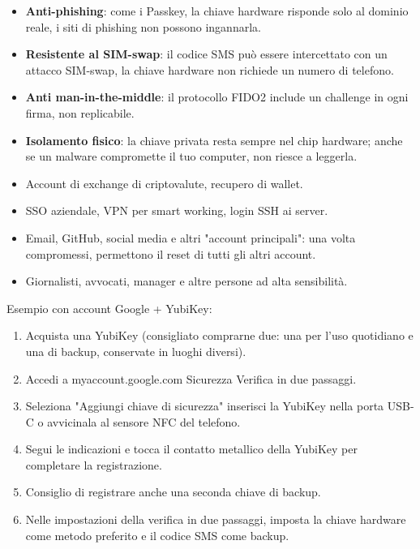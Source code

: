 
\begin{itemize}
  \item \textbf{Anti-phishing}: come i Passkey, la chiave hardware risponde solo al dominio reale, i siti di phishing non possono ingannarla.
  \item \textbf{Resistente al SIM-swap}: il codice SMS può essere intercettato con un attacco SIM-swap, la chiave hardware non richiede un numero di telefono.
  \item \textbf{Anti man-in-the-middle}: il protocollo FIDO2 include un challenge in ogni firma, non replicabile.
  \item \textbf{Isolamento fisico}: la chiave privata resta sempre nel chip hardware; anche se un malware compromette il tuo computer, non riesce a leggerla.
\end{itemize}


\begin{itemize}
  \item Account di exchange di criptovalute, recupero di wallet.
  \item SSO aziendale, VPN per smart working, login SSH ai server.
  \item Email, GitHub, social media e altri "account principali": una volta compromessi, permettono il reset di tutti gli altri account.
  \item Giornalisti, avvocati, manager e altre persone ad alta sensibilità.
\end{itemize}


Esempio con account Google + YubiKey:

\begin{enumerate}
  \item Acquista una YubiKey (consigliato comprarne due: una per l'uso quotidiano e una di backup, conservate in luoghi diversi).
  \item Accedi a myaccount.google.com Sicurezza Verifica in due passaggi.
  \item Seleziona "Aggiungi chiave di sicurezza" inserisci la YubiKey nella porta USB-C o avvicinala al sensore NFC del telefono.
  \item Segui le indicazioni e tocca il contatto metallico della YubiKey per completare la registrazione.
  \item Consiglio di registrare anche una seconda chiave di backup.
  \item Nelle impostazioni della verifica in due passaggi, imposta la chiave hardware come metodo preferito e il codice SMS come backup.
\end{enumerate}

